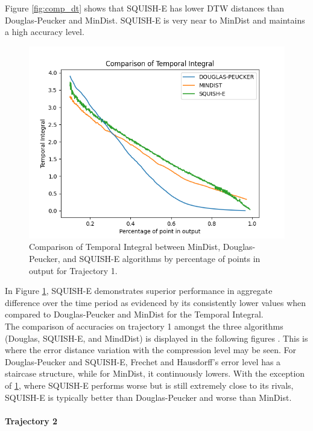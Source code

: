 Figure \ref{fig:comp_dt} shows that SQUISH-E has lower DTW distances than Douglas-Peucker and MinDist. SQUISH-E is very near to MinDist and maintains a high accuracy level.  

\begin{figure}
	\centering
	\includegraphics[width=0.9\linewidth]{figures/Stats/atemp_comp.png}
	\caption{Comparison of Temporal Integral between MinDist, Douglas-Peucker, and SQUISH-E algorithms by percentage of points in output for Trajectory 1.}
	\label{fig:comp_at}
\end{figure}

In Figure \ref{fig:comp_at}, SQUISH-E demonstrates superior performance in aggregate difference over the time period as evidenced by its consistently lower values when compared to Douglas-Peucker and MinDist for the Temporal Integral.
\\

The comparison of accuracies on trajectory 1 amongst the three algorithms (Douglas, SQUISH-E, and MindDist) is displayed in the following figures . This is where the error distance variation with the compression level may be seen. For Douglas-Peucker and SQUISH-E, Frechet and Hausdorff's error level has a staircase structure, while for MinDist, it continuously lowers. With the exception of \ref{fig:comp_at}, where SQUISH-E performs worse but is still extremely close to its rivals, SQUISH-E is typically better than Douglas-Peucker and worse than MinDist.

\paragraph{Trajectory 2}

